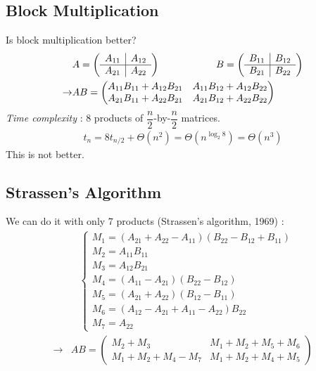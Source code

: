 \subsection{Block Multiplication}
Is block multiplication better?
\begin{align*}
&A=\left(\begin{array}{c|c}
A_{11} & A_{12}\\
\hline
A_{21} & A_{22}
\end{array}\right) \hspace*{2cm} B=\left(\begin{array}{c|c}
B_{11} & B_{12}\\
\hline
B_{21} & B_{22}
\end{array}\right)\\
\rightarrow &AB=\begin{pmatrix}
A_{11}B_{11}+A_{12}B_{21} & A_{11}B_{12}+A_{12}B_{22}\\
A_{21}B_{11}+A_{22}B_{21} & A_{21}B_{12}+A_{22}B_{22}
\end{pmatrix}
\end{align*}
\emph{Time complexity} : 8 products of $\dfrac{n}{2}$-by-$\dfrac{n}{2}$ matrices.
\begin{align*}
t_n=8t_{n/2}+\Theta(n^2)=\Theta\left(n^{\log_2 8}\right)=\Theta\left(n^3\right)
\end{align*}
This is not better. 

\subsection{Strassen's Algorithm}
We can do it with only 7 products (Strassen's algorithm, 1969) : 
\begin{align*}
&\left\{
\begin{array}{l}
M_1=(A_{21}+A_{22}-A_{11})(B_{22}-B_{12}+B_{11})\\
M_2=A_{11}B_{11}\\
M_3=A_{12}B_{21}\\
M_4=(A_{11}-A_{21})(B_{22}-B_{12})\\
M_5=(A_{21}+A_{22})(B_{12}-B_{11})\\
M_6=(A_{12}-A_{21}+A_{11}-A_{22})B_{22}\\
M_7=A_{22}
\end{array}
\right.
\end{align*}
\begin{align*}
\rightarrow & AB=\begin{pmatrix}
M_2+M_3 & M_1+M_2+M_5+M_6\\
M_1+M_2+M_4-M_7 & M_1+M_2+M_4+M_5
\end{pmatrix}
\end{align*}

